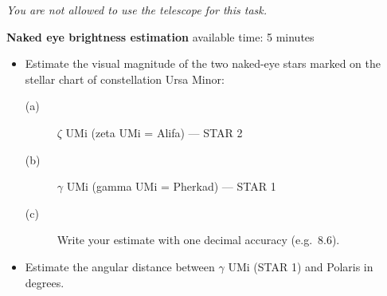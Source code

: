 \emph{You are not allowed to use the telescope for this task.}

\textbf{Naked eye brightness estimation} \hfill available time: 5 minutes

\begin{itemize}
\item Estimate the visual magnitude of the two naked-eye stars marked on the
  stellar chart of constellation Ursa Minor:
  \begin{description}
  \item[(a)] $\zeta$ UMi (zeta UMi = Alifa) --- STAR 2
  \item[(b)] $\gamma$ UMi (gamma UMi = Pherkad) --- STAR 1
  \item[(c)] Write your estimate with one decimal accuracy (e.g.\ 8.6).
  \end{description}
\item Estimate the angular distance between $\gamma$ UMi (STAR 1) and
  Polaris in degrees.
\end{itemize}

